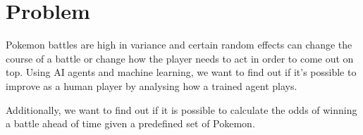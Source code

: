 \section{Problem}
\label{sec:problem-description}

Pokemon battles are high in variance and certain random effects can change
the course of a battle or change how the player needs to act in order to
come out on top. Using AI agents and machine learning, we want to find out
if it's possible to improve as a human player by analysing how a trained
agent plays. 

Additionally, we want to find out if it is possible to calculate the odds 
of winning a battle ahead of time given a predefined set of Pokemon.
